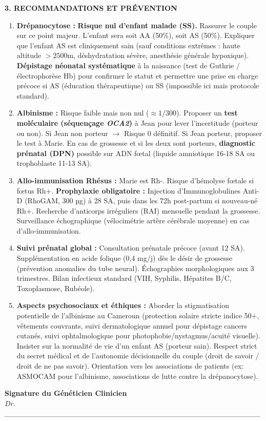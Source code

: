 \documentclass[11pt]{article}
\begin{document}
\begin{exoresolu}
\medskip
\noindent \textbf{3. RECOMMANDATIONS ET PRÉVENTION}
\begin{enumerate}
    \item \textbf{Drépanocytose :} \textbf{Risque nul d'enfant malade (SS).} Rassurer le couple sur ce point majeur. L'enfant sera soit AA (50\%), soit AS (50\%). Expliquer que l'enfant AS est cliniquement sain (sauf conditions extrêmes : haute altitude $>2500$m, déshydratation sévère, anesthésie générale hypoxique). \textbf{Dépistage néonatal systématique} à la naissance (test de Guthrie / électrophorèse Hb) pour confirmer le statut et permettre une prise en charge précoce si AS (éducation thérapeutique) ou SS (impossible ici mais protocole standard).
    \item \textbf{Albinisme :} Risque faible mais non nul ($\approx 1/300$). Proposer un \textbf{test moléculaire (séquençage \emph{OCA2})} à Jean pour lever l'incertitude (porteur ou non). Si Jean non porteur $\rightarrow$ Risque 0 définitif. Si Jean porteur, proposer le test à Marie. En cas de grossesse et si les deux sont porteurs, \textbf{diagnostic prénatal (DPN)} possible sur ADN fœtal (liquide amniotique 16-18 SA ou trophoblaste 11-13 SA).
    \item \textbf{Allo-immunisation Rhésus :} Marie est Rh-. Risque d'hémolyse fœtale si fœtus Rh+. \textbf{Prophylaxie obligatoire :} Injection d'Immunoglobulines Anti-D (RhoGAM, 300 µg) à 28 SA, puis dans les 72h post-partum si nouveau-né Rh+. Recherche d'anticorps irréguliers (RAI) mensuelle pendant la grossesse. Surveillance échographique (vélocimétrie artère cérébrale moyenne) en cas d'allo-immunisation.
    \item \textbf{Suivi prénatal global :} Consultation prénatale précoce (avant 12 SA). Supplémentation en acide folique (0,4 mg/j) dès le désir de grossesse (prévention anomalies du tube neural). Échographies morphologiques aux 3 trimestres. Bilan infectieux standard (VIH, Syphilis, Hépatites B/C, Toxoplasmose, Rubéole).
    \item \textbf{Aspects psychosociaux et éthiques :} Aborder la stigmatisation potentielle de l'albinisme au Cameroun (protection solaire stricte indice 50+, vêtements couvrants, suivi dermatologique annuel pour dépistage cancers cutanés, suivi ophtalmologique pour photophobie/nystagmus/acuité visuelle). Insister sur la normalité de vie d'un enfant AS (porteur sain). Respect strict du secret médical et de l'autonomie décisionnelle du couple (droit de savoir / droit de ne pas savoir). Orientation vers les associations de patients (ex: ASMOCAM pour l'albinisme, associations de lutte contre la drépanocytose).
\end{enumerate}

\medskip
\noindent \textbf{Signature du Généticien Clinicien} \\
\textit{Dr. \_\_\_\_\_\_\_\_\_\_\_\_\_\_\_\_\_\_\_\_\_\_\_\_\_\_\_\_\_\_\_\_\_\_\_\_\_\_\_\_\_\_\_\_\_\_\_\_}
\end{exoresolu}
\end{document}
